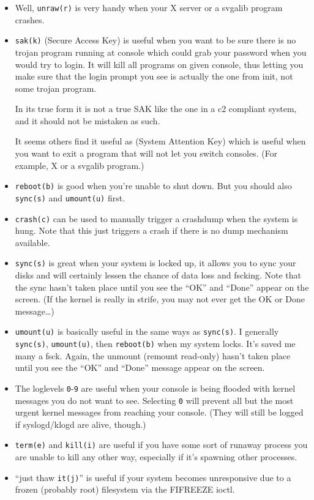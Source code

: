 \documentclass[article,letterpaper]{memoir}
\begin{document}
\begin{itemize}
  \item Well, \texttt{unraw(r)} is very handy when your X server or a svgalib program
crashes.

\item \texttt{sak(k)} (Secure Access Key) is useful when you want to be sure there is
no trojan program running at console which could grab your password when
you would try to login. It will kill all programs on given console, thus
letting you make sure that the login prompt you see is actually the one
from init, not some trojan program.

In its true form it is not a true SAK like the one in a c2 compliant
system, and it should not be mistaken as such.

It seems others find it useful as (System Attention Key) which is useful
when you want to exit a program that will not let you switch consoles.
(For example, X or a svgalib program.)

\item \texttt{reboot(b)} is good when you're unable to shut down. But you
should also \texttt{sync(s)} and \texttt{umount(u)} first.

\item \texttt{crash(c)} can be used to manually trigger a crashdump when the
system is hung. Note that this just triggers a crash if there is no dump
mechanism available.

\item \texttt{sync(s)} is great when your system is locked up, it allows you
to sync your disks and will certainly lessen the chance of data loss and
fscking. Note that the sync hasn't taken place until you see the ``OK''
and ``Done'' appear on the screen. (If the kernel is really in strife,
you may not ever get the OK or Done message\ldots{})

\item \texttt{umount(u)} is basically useful in the same ways as
\texttt{sync(s)}. I generally \texttt{sync(s)}, \texttt{umount(u)}, then
\texttt{reboot(b)} when my system locks. It's saved me many a fsck.
Again, the unmount (remount read-only) hasn't taken place until you see
the ``OK'' and ``Done'' message appear on the screen.

\item The loglevels \texttt{0}-\texttt{9} are useful when your console is
being flooded with kernel messages you do not want to see. Selecting
\texttt{0} will prevent all but the most urgent kernel messages from
reaching your console. (They will still be logged if syslogd/klogd are
alive, though.)

\item \texttt{term(e)} and \texttt{kill(i)} are useful if you have some sort
of runaway process you are unable to kill any other way, especially if
it's spawning other processes.

\item ``just thaw \texttt{it(j)}'' is useful if your system becomes
unresponsive due to a frozen (probably root) filesystem via the FIFREEZE
ioctl.

\end{itemize}
\end{document}
